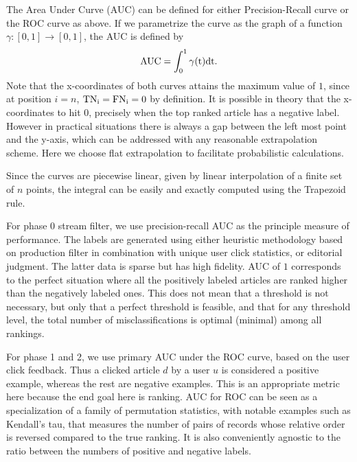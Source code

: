\begin{definition}
The Area Under Curve (AUC) can be defined for either Precision-Recall curve or the ROC curve as above. If we parametrize the curve as the graph of a function $\gamma:[0,1] \to [0,1]$, the AUC is defined by
\begin{align*}
\rm{AUC} = \int_0^1 \gamma(t) dt.
\end{align*}
Note that the x-coordinates of both curves attains the maximum value of $1$, since at position $i = n$, $\rm{TN}_i = \rm{FN}_i = 0$ by definition. It is possible in theory that the x-coordinates to hit $0$, precisely when the top ranked article has a negative label. However in practical situations there is always a gap between the left most point and the y-axis, which can be addressed with any reasonable extrapolation scheme. Here we choose flat extrapolation to facilitate probabilistic calculations.

Since the curves are piecewise linear, given by linear interpolation of a finite set of $n$ points, the integral can be easily and exactly computed using the Trapezoid rule.
\end{definition}

For phase 0 stream filter, we use precision-recall AUC as the principle measure of performance. The labels are generated using either heuristic methodology based on production filter in combination with unique user click statistics, or editorial judgment. The latter data is sparse but has high fidelity. AUC of $1$ corresponds to the perfect situation where all the positively labeled articles are ranked higher than the negatively labeled ones. This does not mean that a threshold is not necessary, but only that a perfect threshold is feasible, and that for any threshold level, the total number of misclassifications is optimal (minimal) among all rankings. 

For phase 1 and 2, we use primary AUC under the ROC curve, based on the user click feedback. Thus a clicked article $d$ by a user $u$ is considered a positive example, whereas the rest are negative examples. This is an appropriate metric here because the end goal here is ranking. AUC for ROC can be seen as a specialization of a family of permutation statistics, with notable examples such as Kendall's tau, that measures the number of pairs of records whose relative order is reversed compared to the true ranking. It is also conveniently agnostic to the ratio between the numbers of positive and negative labels. 



